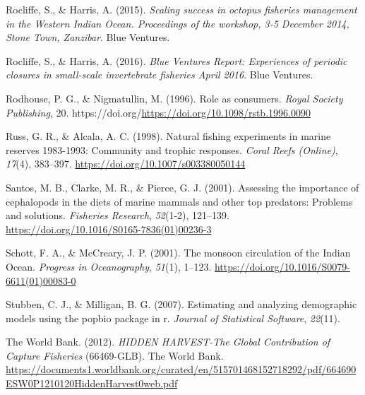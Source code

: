 \documentclass[
]{article}
\newlength{\cslhangindent}
\newlength{\cslentryspacingunit} %
\newenvironment{CSLReferences}[2] %
 {%
  \setlength{\parindent}{0pt}
  \ifodd #1
  \let\oldpar\par
  \def\par{\hangindent=\cslhangindent\oldpar}
  \fi
  \setlength{\parskip}{#2\cslentryspacingunit}
 }%
 {}
\begin{document}
\begin{CSLReferences}{1}{2}
\leavevmode{}%
Rocliffe, S., \& Harris, A. (2015). \emph{Scaling success in octopus fisheries management in the {Western} {Indian} {Ocean}. {Proceedings} of the workshop, 3-5 {December} 2014, {Stone} {Town}, {Zanzibar}}. Blue Ventures.

\leavevmode{}%
Rocliffe, S., \& Harris, A. (2016). \emph{Blue {Ventures} {Report}: {Experiences} of periodic closures in small-scale invertebrate fisheries {April} 2016}. Blue Ventures.

\leavevmode{}%
Rodhouse, P. G., \& Nigmatullin, M. (1996). Role as consumers. \emph{Royal Society Publishing}, 20. https://doi.org/\url{https://doi.org/10.1098/rstb.1996.0090}

\leavevmode{}%
Russ, G. R., \& Alcala, A. C. (1998). Natural fishing experiments in marine reserves 1983-1993: Community and trophic responses. \emph{Coral Reefs (Online)}, \emph{17}(4), 383--397. \url{https://doi.org/10.1007/s003380050144}

\leavevmode{}%
Santos, M. B., Clarke, M. R., \& Pierce, G. J. (2001). Assessing the importance of cephalopods in the diets of marine mammals and other top predators: Problems and solutions. \emph{Fisheries Research}, \emph{52}(1-2), 121--139. \url{https://doi.org/10.1016/S0165-7836(01)00236-3}

\leavevmode{}%
Schott, F. A., \& McCreary, J. P. (2001). The monsoon circulation of the {Indian} {Ocean}. \emph{Progress in Oceanography}, \emph{51}(1), 1--123. \url{https://doi.org/10.1016/S0079-6611(01)00083-0}

\leavevmode{}%
Stubben, C. J., \& Milligan, B. G. (2007). Estimating and analyzing demographic models using the popbio package in r. \emph{Journal of Statistical Software}, \emph{22}(11).

\leavevmode{}%
The World Bank. (2012). \emph{{HIDDEN} {HARVEST}-{The} {Global} {Contribution} of {Capture} {Fisheries}} (66469-GLB). The World Bank. \url{https://documents1.worldbank.org/curated/en/515701468152718292/pdf/664690ESW0P1210120HiddenHarvest0web.pdf}


\end{CSLReferences}
\end{document}
